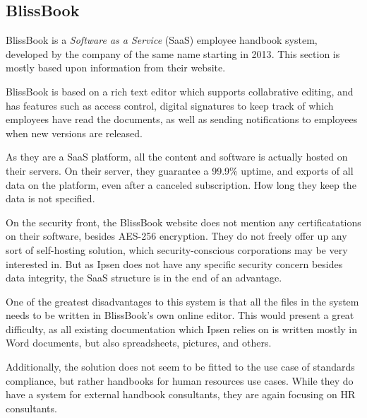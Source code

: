 \subsection{BlissBook}
BlissBook is a \textit{Software as a Service} (SaaS) employee handbook system, developed by the company of the same name starting in 2013\cite{BlissbookInfo}.
This section is mostly based upon information from their website\cite{BlissbookContents}.

BlissBook is based on a rich text editor which supports collabrative editing, and has features such as access control, digital signatures to keep track of which employees have read the documents, as well as sending notifications to employees when new versions are released.

As they are a SaaS platform, all the content and software is actually hosted on their servers.
On their server, they guarantee a 99.9\% uptime, and exports of all data on the platform, even after a canceled subscription.
How long they keep the data is not specified.

On the security front, the BlissBook website does not mention any certificatations on their software, besides  AES-256 encryption.\cite{BlissbookSecurity}
They do not freely offer up any sort of self-hosting solution, which security-conscious corporations may be very interested in.
But as Ipsen does not have any specific security concern besides data integrity, the SaaS structure is in the end of an advantage.

One of the greatest disadvantages to this system is that all the files in the system needs to be written in BlissBook's own online editor.
This would present a great difficulty, as all existing documentation which Ipsen relies on is written mostly in Word documents, but also spreadsheets, pictures, and others.

Additionally, the solution does not seem to be fitted to the use case of standards compliance, but rather handbooks for human resources use cases.
While they do have a system for external handbook consultants, they are again focusing on HR consultants.\cite{BlissbookHandbook}
